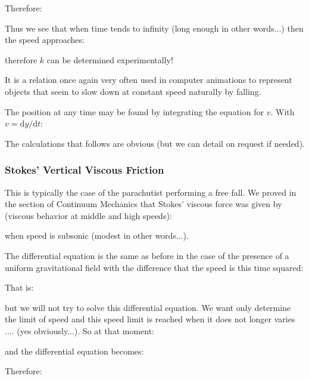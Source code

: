 	Therefore:
	
	Thus we see that when time tends to infinity (long enough in other words...) then the speed approaches:
	
	therefore $k$ can be determined experimentally!

	It is a relation once again very often used in computer animations to represent objects that seem to slow down at constant speed naturally by falling.
	
	The position at any time may be found by integrating the equation for $v$. With $v = \mathrm{d}y/\mathrm{d}t$:
	
	The calculations that follows are obvious (but we can detail on request if needed).
	
	\subsubsection{Stokes' Vertical Viscous Friction}
	This is typically the case of the parachutist performing a free fall. We proved in the section of Continuum Mechanics that Stokes' viscous force was given by (viscous behavior at middle and high speeds):
	
	when speed is subsonic (modest in other words...).
	
	The differential equation is the same as before in the case of the presence of a uniform gravitational field with the difference that the speed is this time squared:
	
	That is:
	
	but we will not try to solve this differential equation. We want only determine the limit of speed and this speed limit is reached when it does not longer varies .... (yes obviously...). So at that moment:
	
	and the differential equation becomes:
	
	Therefore:
	
